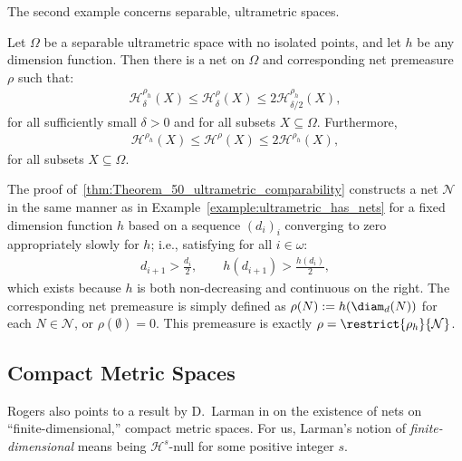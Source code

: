 The second example concerns separable, ultrametric spaces. 

\begin{theorem}
    \label{thm:Theorem_50_ultrametric_comparability}
    Let $\Omega$ be a separable ultrametric space with no isolated points, and let $h$ be any dimension function. Then there is a net on $\Omega$ and corresponding net premeasure $\rho$ such that:
    \begin{align*}
        \mathcal{H}^{\rho_h}_\delta(X) \leq \mathcal{H}^\rho_\delta(X) \leq 2 \mathcal{H}^{\rho_h}_{\delta / 2} (X),
    \end{align*}
    for all sufficiently small $\delta > 0$ and for all subsets $X \subseteq \Omega$. Furthermore,
    \begin{align*}
        \mathcal{H}^{\rho_h}(X) \leq \mathcal{H}^\rho(X) \leq 2 \mathcal{H}^{\rho_h} (X),
    \end{align*}
    for all subsets $X \subseteq \Omega$.
\end{theorem}

The proof of~\ref{thm:Theorem_50_ultrametric_comparability} constructs a net $\mathcal{N}$ in the same manner as in Example~\ref{example:ultrametric_has_nets} for a fixed dimension function $h$ based on a sequence $(d_i)_i$ converging to zero appropriately slowly for $h$; i.e., satisfying for all $i \in \omega$:
\begin{align*}
    d_{i + 1} > \frac{d_i}{2}, \qquad h(d_{i + 1}) > \frac{h(d_i)}{2},
\end{align*}
which exists because $h$ is both non-decreasing and continuous on the right. The corresponding net premeasure is simply defined as $\rho(N) := h(\diam_d(N))$ for each $N \in \mathcal{N}$, or $\rho(\emptyset) = 0$. This premeasure is exactly $\rho = \restrict{\rho_h}{\mathcal{N}}$. 

\subsection{Compact Metric Spaces}

Rogers also points to a result by D.~Larman in \cite{Lar67} on the existence of nets on ``finite-dimensional,'' compact metric spaces. For us, Larman's notion of \textit{finite-dimensional} means being $\mathcal{H}^s$-null for some positive integer $s$. 

